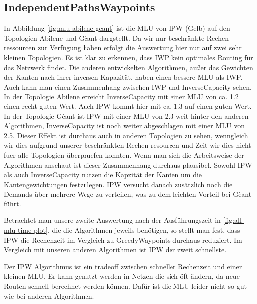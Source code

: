 \documentclass[sigconf,noacm,review]{acmart}
\begin{document}
\subsection{IndependentPathsWaypoints}
In Abbildung \ref{fig:mlu-abilene-geant} ist die MLU von IPW (Gelb)  auf den Topologien Abilene und Gèant dargstellt.
Da wir nur beschränkte Rechen-ressourcen zur Verfügung haben erfolgt die Auswertung hier nur auf zwei sehr kleinen Topologien.
Es ist klar zu erkennen, dass IWP kein optimales Routing für das Netzwerk findet.
Die anderen entwickelten Algorithmen, außer das Gewichten der Kanten nach ihrer inversen Kapazität, haben einen bessere MLU als IWP.
Auch kann man einen Zusammenhang zwischen IWP und InverseCapacity sehen. In  der Topologie Abilene erreicht InverseCapacity mit einer MLU von ca. 1.2 einen recht guten Wert.
Auch IPW kommt hier mit ca. 1.3 auf einen guten Wert.
In der Topologie Gèant ist IPW mit einer MLU von 2.3 weit hinter den anderen Algorithmen, InverseCapacity ist noch weiter abgeschlagen mit einer MLU von 2.5.
Dieser Effekt ist durchaus auch in anderen Topologien zu sehen, wenngleich wir dies aufgrund unserer beschränkten Rechen-resourcen und Zeit wir dies nicht fuer alle Topologien überpruefen konnten. 
Wenn man sich die Arbeitsweise der Algorithmen anschaut ist dieser Zusammenhang durchaus plausibel. 
Sowohl IPW als auch InverseCapacity nutzen die Kapzität der Kanten um die Kantengewichtungen festzulegen. 
IPW versucht danach zusätzlich noch die Demands über mehrere Wege zu verteilen, was zu dem leichten Vorteil bei Gèant führt.

Betrachtet man unsere zweite Auswertung nach der Ausführungszeit in \ref{fig:all-mlu-time-plot}, die die Algorithmen jeweils benötigen, 
so stellt man fest, dass IPW die Rechenzeit im Vergleich zu GreedyWaypoints durchaus reduziert. 
Im Vergleich mit unseren anderen Algorithmen ist IPW der zweit schnellste.

Der IPW Algorithmus ist ein tradeoff zwischen schneller Rechenzeit und einer kleinen MLU. 
Er kann genutzt werden in Netzen die sich öft ändern, da neue Routen schnell berechnet werden können. 
Dafür ist die MLU leider nicht so gut wie bei anderen Algorithmen.
\end{document}
